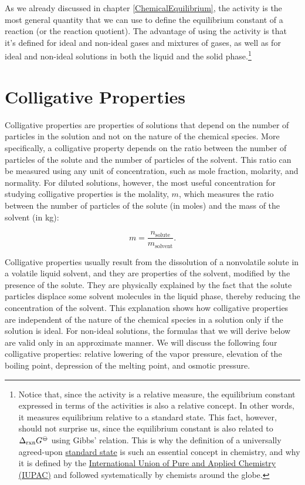\documentclass[
  9pt,
]{extbook}
\theoremstyle{definition}
\theoremstyle{definition}
\theoremstyle{definition}
\theoremstyle{definition}
\theoremstyle{remark}
\begin{document}
As we already discussed in chapter \ref{ChemicalEquilibrium}, the activity is the most general quantity that we can use to define the equilibrium constant of a reaction (or the reaction quotient). The advantage of using the activity is that it's defined for ideal and non-ideal gases and mixtures of gases, as well as for ideal and non-ideal solutions in both the liquid and the solid phase.\footnote{Notice that, since the activity is a relative measure, the equilibrium constant expressed in terms of the activities is also a relative concept. In other words, it measures equilibrium relative to a standard state. This fact, however, should not surprise us, since the equilibrium constant is also related to \(\Delta_{\text{rxn}} G^{{-\kern-6pt{\ominus}\kern-6pt-}}\) using Gibbs' relation. This is why the definition of a universally agreed-upon \href{https://en.wikipedia.org/wiki/Standard_state}{standard state} is such an essential concept in chemistry, and why it is defined by the \href{https://en.wikipedia.org/wiki/International_Union_of_Pure_and_Applied_Chemistry}{International Union of Pure and Applied Chemistry (IUPAC)} and followed systematically by chemists around the globe.}

\section{Colligative Properties}\label{colligative-properties}

Colligative properties are properties of solutions that depend on the number of particles in the solution and not on the nature of the chemical species. More specifically, a colligative property depends on the ratio between the number of particles of the solute and the number of particles of the solvent. This ratio can be measured using any unit of concentration, such as mole fraction, molarity, and normality. For diluted solutions, however, the most useful concentration for studying colligative properties is the molality, \(m\), which measures the ratio between the number of particles of the solute (in moles) and the mass of the solvent (in kg):

\begin{equation}
m = \frac{n_{\text{solute}}}{m_{\text{solvent}}}.
\label{eq:coll1}
\end{equation}

Colligative properties usually result from the dissolution of a nonvolatile solute in a volatile liquid solvent, and they are properties of the solvent, modified by the presence of the solute. They are physically explained by the fact that the solute particles displace some solvent molecules in the liquid phase, thereby reducing the concentration of the solvent. This explanation shows how colligative properties are independent of the nature of the chemical species in a solution only if the solution is ideal. For non-ideal solutions, the formulas that we will derive below are valid only in an approximate manner. We will discuss the following four colligative properties: relative lowering of the vapor pressure, elevation of the boiling point, depression of the melting point, and osmotic pressure.
\end{document}
